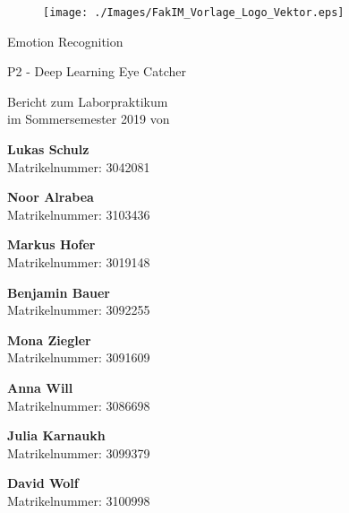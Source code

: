 \documentclass[12pt,a4paper,headinclude,twoside, plainheadsepline, open=right,numbers=noenddot]{scrreprt}
\begin{document}
\pagestyle{empty}

\clearscrheadings\clearscrplain

\begin{titlepage}
\begin{figure}[thb]
       \texttt{[image: ./Images/FakIM\_Vorlage\_Logo\_Vektor.eps]}
\end{figure}
\begin{center}
\rule{0pt}{0pt}
\vfill

\begin{huge}
Emotion Recognition\\[0.75ex]
\end{huge}
\begin{large}
P2 - Deep Learning Eye Catcher
\end{large}


\vfill
\vfill

Bericht zum Laborpraktikum\\
im Sommersemester 2019 von\\
\vfill
\setlength{\columnsep}{.0cm}
\begin{multicols}{1}

\textbf{Lukas Schulz}\\
Matrikelnummer: 3042081

\textbf{Noor Alrabea}\\
Matrikelnummer: 3103436
\end{multicols}

\begin{multicols}{2}
\textbf{Markus Hofer}\\
Matrikelnummer: 3019148

\textbf{Benjamin Bauer}\\
Matrikelnummer: 3092255
\end{multicols}

\begin{multicols}{2}
\textbf{Mona Ziegler}\\
Matrikelnummer: 3091609

\textbf{Anna Will}\\
Matrikelnummer: 3086698
\end{multicols}

\begin{multicols}{2}
\textbf{Julia Karnaukh}\\
Matrikelnummer: 3099379

\textbf{David Wolf}\\
Matrikelnummer: 3100998
\end{multicols}


\end{center}
\end{titlepage}
\end{document}
